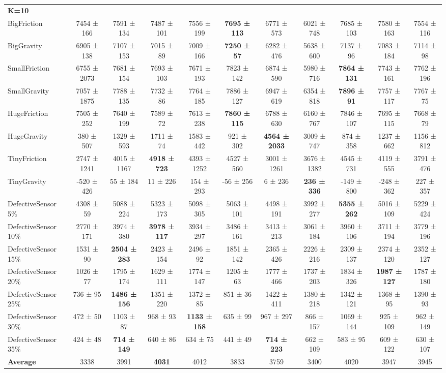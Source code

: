 \scriptsize
\begin{tabular}{l|c|ccc|ccc|ccc} \\
\textbf{K=10} & & & & & & & & & & \\
BigFriction &7454 ± 166 &7591 ± 134 &7487 ± 101 &7556 ± 199 &\textbf{7695 ± 113} &6771 ± 573 &6021 ± 748 &7685 ± 103 &7580 ± 163 &7554 ± 116 \\
BigGravity &6905 ± 138 &7107 ± 153 &7015 ± 89 &7009 ± 166 &\textbf{7250 ± 57} &6282 ± 476 &5638 ± 600 &7137 ± 96 &7083 ± 184 &7114 ± 98 \\
SmallFriction &6755 ± 2073 &7681 ± 154 &7693 ± 103 &7671 ± 193 &7823 ± 142 &6874 ± 590 &5980 ± 716 &\textbf{7864 ± 131} &7743 ± 161 &7762 ± 196 \\
SmallGravity &7057 ± 1875 &7788 ± 135 &7732 ± 86 &7764 ± 185 &7886 ± 127 &6947 ± 619 &6354 ± 818 &\textbf{7896 ± 91} &7757 ± 117 &7767 ± 75 \\
HugeFriction &7505 ± 252 &7640 ± 199 &7589 ± 72 &7613 ± 238 &\textbf{7860 ± 115} &6788 ± 630 &6160 ± 767 &7846 ± 107 &7695 ± 115 &7668 ± 79 \\
HugeGravity &380 ± 507 &1329 ± 593 &1711 ± 74 &1583 ± 442 &921 ± 302 &\textbf{4564 ± 2033} &3009 ± 747 &874 ± 358 &1237 ± 662 &1156 ± 812 \\
TinyFriction &2747 ± 1241 &4015 ± 1167 &\textbf{4918 ± 723} &4393 ± 1252 &4527 ± 560 &3001 ± 1261 &3676 ± 1382 &4545 ± 731 &4119 ± 555 &3791 ± 476 \\
TinyGravity &-520 ± 426 &55 ± 184 &11 ± 226 &154 ± 293 &-56 ± 256 &6 ± 236 &\textbf{236 ± 336} &-149 ± 800 &-248 ± 362 &227 ± 357 \\
DefectiveSensor 5\% &4308 ± 59 &5088 ± 224 &5323 ± 173 &5098 ± 305 &5063 ± 101 &4498 ± 191 &3992 ± 277 &\textbf{5355 ± 262} &5016 ± 109 &5229 ± 424 \\
DefectiveSensor 10\% &2770 ± 171 &3974 ± 380 &\textbf{3978 ± 117} &3934 ± 297 &3486 ± 161 &3413 ± 213 &3061 ± 184 &3960 ± 106 &3711 ± 194 &3779 ± 196 \\
DefectiveSensor 15\% &1531 ± 90 &\textbf{2504 ± 283} &2423 ± 154 &2496 ± 92 &1851 ± 142 &2365 ± 426 &2226 ± 216 &2309 ± 137 &2374 ± 120 &2352 ± 127 \\
DefectiveSensor 20\% &1026 ± 77 &1795 ± 174 &1629 ± 111 &1774 ± 147 &1205 ± 63 &1777 ± 466 &1737 ± 203 &1834 ± 326 &\textbf{1987 ± 127} &1787 ± 180 \\
DefectiveSensor 25\% &736 ± 95 &\textbf{1486 ± 156} &1351 ± 220 &1372 ± 85 &851 ± 36 &1422 ± 411 &1380 ± 218 &1342 ± 121 &1368 ± 95 &1390 ± 93 \\
DefectiveSensor 30\% &472 ± 50 &1103 ± 87 &968 ± 93 &\textbf{1133 ± 158} &635 ± 99 &967 ± 297 &866 ± 157 &1069 ± 144 &925 ± 109 &962 ± 149 \\
DefectiveSensor 35\% &424 ± 48 &\textbf{714 ± 149} &640 ± 86 &634 ± 75 &441 ± 49 &\textbf{714 ± 223} &662 ± 109 &583 ± 95 &609 ± 122 &630 ± 107 \\
\bottomrule
\textbf{Average} &3338 &3991 &\textbf{4031} &4012 &3833 &3759 &3400 &4020 &3947 &3945 \\
\bottomrule
\end{tabular}